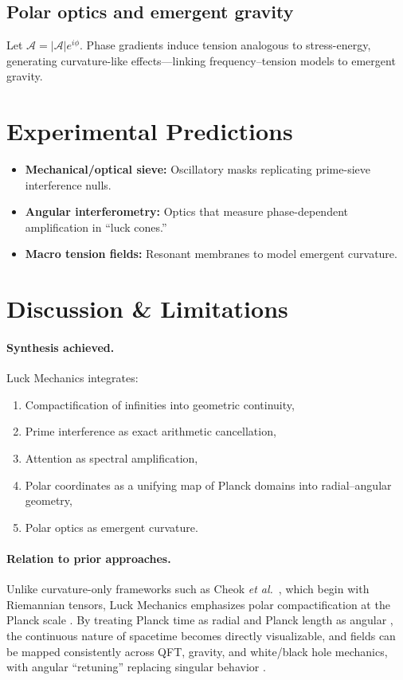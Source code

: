 \documentclass[12pt]{article}
\newcommand{\Afield}{\mathcal{A}}
\newcommand{\phiang}{\phi}
\theoremstyle{plain}
\theoremstyle{definition}
\begin{document}
\subsection{Polar optics and emergent gravity}
Let $\Afield = |\Afield|e^{i\phiang}$. Phase gradients induce tension analogous to stress-energy, generating curvature-like effects—linking frequency–tension models to emergent gravity.

\section{Experimental Predictions}
\begin{itemize}[leftmargin=1.1em]
  \item \textbf{Mechanical/optical sieve:} Oscillatory masks replicating prime-sieve interference nulls.
  \item \textbf{Angular interferometry:} Optics that measure phase-dependent amplification in ``luck cones.''
  \item \textbf{Macro tension fields:} Resonant membranes to model emergent curvature.
\end{itemize}

\section{Discussion \& Limitations}
\paragraph{Synthesis achieved.} Luck Mechanics integrates:
\begin{enumerate}[leftmargin=1.1em]
  \item Compactification of infinities into geometric continuity,
  \item Prime interference as exact arithmetic cancellation,
  \item Attention as spectral amplification,
  \item Polar coordinates as a unifying map of Planck domains into radial--angular geometry,
  \item Polar optics as emergent curvature.
\end{enumerate}

\paragraph{Relation to prior approaches.} Unlike curvature-only frameworks such as Cheok \emph{et al.}~\citep{Cheok2025}, which begin with Riemannian tensors, Luck Mechanics emphasizes polar compactification at the Planck scale \citep{PlanckUnits}. By treating Planck time as radial and Planck length as angular \citep{PolarCoords}, the continuous nature of spacetime becomes directly visualizable, and fields can be mapped consistently across QFT, gravity, and white/black hole mechanics, with angular “retuning” replacing singular behavior \citep{PhysRevResearch033343}.
\end{document}
